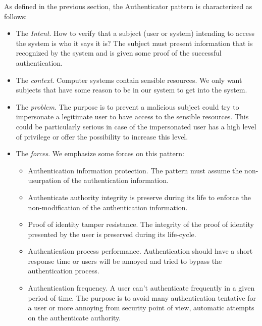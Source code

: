 As defined in the previous section, the Authenticator pattern is characterized as follows:  
\begin{itemize}
    \item The \emph{Intent}. How to verify that a subject (user or system) intending to access the system is who it says it is? The subject must present information that is recognized by the system and is given some proof of the successful authentication.
    
    \item The \emph{context}. Computer systems contain sensible resources. We only want subjects that have some reason to be in our system to get into the system. 
    
    \item The \emph{problem}. The purpose is to prevent a malicious subject could try to impersonate a legitimate user to have access to the sensible resources. This could be particularly serious in case of the  impersonated user has a high level of privilege or offer the possibility to increase this level.

    \item The \emph{forces}. We emphasize some forces on this pattern:
    \begin{itemize}
        \item Authentication information protection. The pattern must assume the non-usurpation of the authentication information.
        
        \item Authenticate authority integrity is preserve during its life to enforce the non-modification of the authentication information.
        
        \item Proof of identity tamper resistance. The integrity of the proof of identity presented by the user is preserved during its life-cycle.
        
        \item Authentication process performance. Authentication should have a short response time or users will be annoyed and tried to bypass the authentication process.

        \item Authentication frequency. A user can't authenticate frequently in a given period of time. The purpose is to avoid many authentication tentative for a user or more annoying from security point of view, automatic attempts on the authenticate authority. 
    \end{itemize}


\end{itemize}
